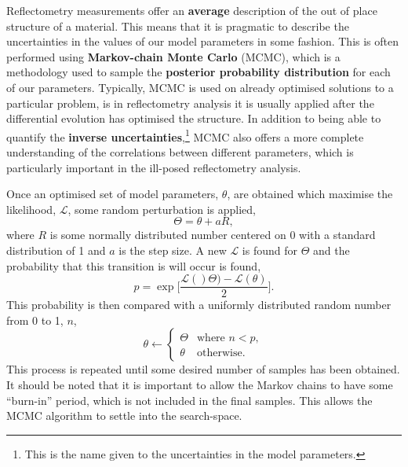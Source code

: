 \documentclass[twoside,symmetric]{tufte-handout}
\begin{document}
Reflectometry measurements offer an \textbf{average} description of the out of place structure of a material. 
This means that it is pragmatic to describe the uncertainties in the values of our model parameters in some fashion. 
This is often performed using \textbf{Markov-chain Monte Carlo} (MCMC), which is a methodology used to sample the \textbf{posterior probability distribution} for each of our parameters.\cite{sivia_data_2006}
Typically, MCMC is used on already optimised solutions to a particular problem, is in reflectometry analysis it is usually applied after the differential evolution has optimised the structure. 
In addition to being able to quantify the \textbf{inverse uncertainties},\footnote{This is the name given to the uncertainties in the model parameters.} MCMC also offers a more complete understanding of the correlations between different parameters,\cite{gilks_markov_1995} which is particularly important in the ill-posed reflectometry analysis. 

Once an optimised set of model parameters, $\theta$, are obtained which maximise the likelihood, $\mathcal{L}$, some random perturbation is applied, 
%
\begin{equation}
    \Theta = \theta + aR,
\end{equation}
%
where $R$ is some normally distributed number centered on \num{0} with a standard distribution of \num{1} and $a$ is the step size. 
A new $\mathcal{L}$ is found for $\Theta$ and the probability that this transition is will occur is found, 
%
\begin{equation}
    p = \exp{\bigg[\frac{\mathcal{L}()\Theta) - \mathcal{L}(\theta)}{2}\bigg]}. 
\end{equation}
%
This probability is then compared with a uniformly distributed random number from \num{0} to \num{1}, $n$,
%
\begin{equation}
    \theta \leftarrow
    \begin{cases}
        \Theta & \text{where } n < p,\\
        \theta & \text{otherwise}.
    \end{cases}
\end{equation}
%
This process is repeated until some desired number of samples has been obtained. 
It should be noted that it is important to allow the Markov chains to have some ``burn-in'' period, which is not included in the final samples. 
This allows the MCMC algorithm to settle into the search-space. 
\end{document}
